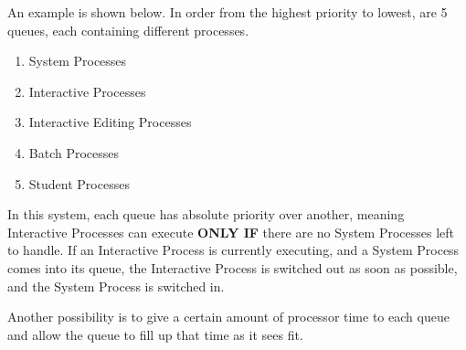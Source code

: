 An example  is shown below.
In order from the highest priority to lowest, are 5 queues, each containing different processes.
\begin{enumerate}[noitemsep]
\item System Processes
\item Interactive Processes
\item Interactive Editing Processes
\item Batch Processes
\item Student Processes
\end{enumerate}

In this system, each queue has absolute priority over another, meaning Interactive Processes can execute \textbf{ONLY IF} there are no System Processes left to handle.
If an Interactive Process is currently executing, and a System Process comes into its queue, the Interactive Process is switched out as soon as possible, and the System Process is switched in.

Another possibility is to give a certain amount of processor time to each queue and allow the queue to fill up that time as it sees fit.

